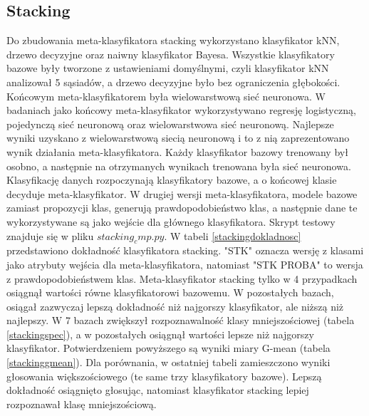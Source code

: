 \subsection{Stacking}
Do zbudowania meta-klasyfikatora stacking wykorzystano klasyfikator kNN, drzewo decyzyjne oraz naiwny klasyfikator Bayesa. Wszystkie klasyfikatory bazowe były tworzone z ustawieniami domyślnymi, czyli klasyfikator kNN analizował 5 sąsiadów, a drzewo decyzyjne było bez ograniczenia głębokości. Końcowym meta-klasyfikatorem była wielowarstwową sieć neuronowa. W badaniach jako końcowy meta-klasyfikator wykorzystywano regresję logistyczną, pojedynczą sieć neuronową oraz wielowarstwowa sieć neuronową. Najlepsze wyniki uzyskano z wielowarstwową siecią neuronową i to z nią zaprezentowano wynik działania meta-klasyfikatora. Każdy klasyfikator bazowy trenowany był osobno, a następnie na otrzymanych wynikach trenowana była sieć neuronowa. Klasyfikację danych rozpoczynają klasyfikatory bazowe, a o końcowej klasie decyduje meta-klasyfikator. W drugiej wersji meta-klasyfikatora, modele bazowe zamiast propozycji klas, generują prawdopodobieństwo klas, a następnie dane te wykorzystywane są jako wejście dla głównego klasyfikatora. Skrypt testowy znajduje się w pliku $stacking_cmp.py$. W tabeli \ref{stackingdokladnosc} przedstawiono dokładność klasyfikatora stacking. "STK" oznacza wersję z klasami jako atrybuty wejścia dla meta-klasyfikatora, natomiast "STK PROBA" to wersja z prawdopodobieństwem klas. Meta-klasyfikator stacking tylko w 4 przypadkach osiągnął wartości równe klasyfikatorowi bazowemu. W pozostałych bazach, osiągał zazwyczaj lepszą dokładność niż najgorszy klasyfikator, ale niższą niż najlepszy. W 7 bazach zwiększył rozpoznawalność klasy mniejszościowej (tabela \ref{stackingspec}), a w pozostałych osiągnął wartości lepsze niż najgorszy klasyfikator. Potwierdzeniem powyższego są wyniki miary G-mean (tabela \ref{stackinggmean}). Dla porównania, w ostatniej tabeli zamieszczono wyniki głosowania większościowego (te same trzy klasyfikatory bazowe). Lepszą dokładność osiągnięto głosując, natomiast klasyfikator stacking lepiej rozpoznawał klasę mniejszościową.



